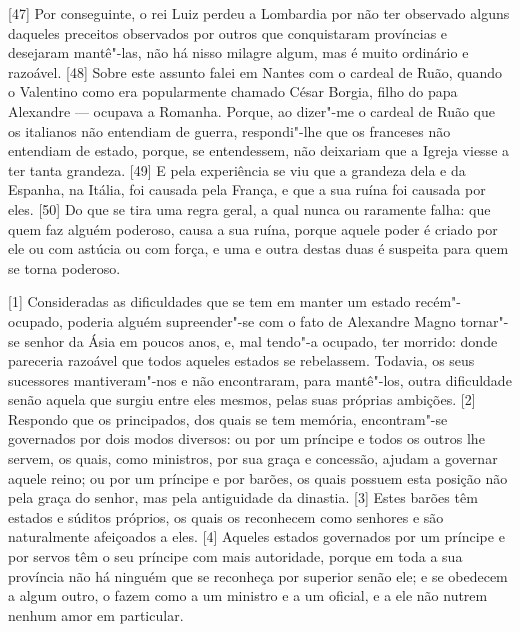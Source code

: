 {[}47{]} Por conseguinte, o rei Luiz perdeu a Lombardia por não ter
observado alguns daqueles preceitos observados por outros que
conquistaram províncias e desejaram mantê"-las, não há nisso milagre
algum, mas é muito ordinário e razoável. {[}48{]} Sobre este assunto
falei em Nantes com o cardeal de Ruão, quando o Valentino como era
popularmente chamado César Borgia, filho do papa Alexandre --- ocupava a Romanha. Porque, ao dizer"-me o
cardeal de Ruão que os italianos não entendiam de guerra, respondi"-lhe
que os franceses não entendiam de estado, porque, se entendessem, não
deixariam que a Igreja viesse a ter tanta grandeza. {[}49{]} E pela
experiência se viu que a grandeza dela e da Espanha, na Itália, foi
causada pela França, e que a sua ruína foi causada por eles. {[}50{]} Do
que se tira uma regra geral, a qual nunca ou raramente falha: que quem
faz alguém poderoso, causa a sua ruína, porque aquele poder é criado por
ele ou com astúcia ou com força, e uma e outra destas duas é suspeita
para quem se torna poderoso.


{[}1{]} Consideradas as dificuldades que se tem em manter um estado
recém"-ocupado, poderia alguém supreender"-se com o fato de Alexandre
Magno tornar"-se senhor da Ásia em poucos anos, e,
mal tendo"-a ocupado, ter morrido: donde pareceria razoável que todos
aqueles estados se rebelassem. Todavia, os seus sucessores
mantiveram"-nos e não encontraram, para mantê"-los, outra dificuldade
senão aquela que surgiu entre eles mesmos, pelas suas próprias ambições.
{[}2{]} Respondo que os principados, dos quais se tem memória,
encontram"-se governados por dois modos diversos: ou por um príncipe e
todos os outros lhe servem, os quais, como ministros, por sua graça e
concessão, ajudam a governar aquele reino; ou por um príncipe e por
barões, os quais possuem esta posição não pela graça do senhor, mas pela
antiguidade da dinastia. {[}3{]} Estes barões têm estados e súditos
próprios, os quais os reconhecem como senhores e são naturalmente
afeiçoados a eles. {[}4{]} Aqueles estados governados por um príncipe e
por servos têm o seu príncipe com mais autoridade, porque em toda a sua
província não há ninguém que se reconheça por superior senão ele; e se
obedecem a algum outro, o fazem como a um ministro e a um oficial, e a
ele não nutrem nenhum amor em particular.

